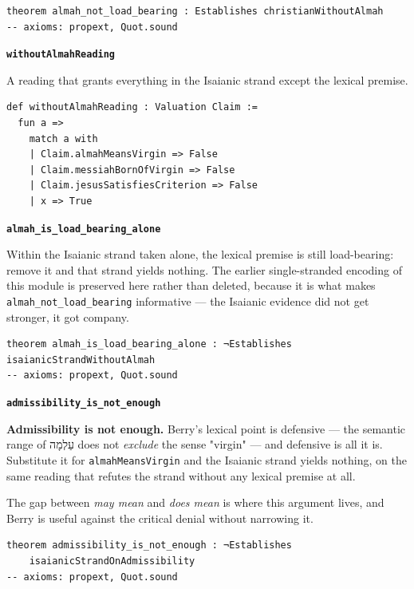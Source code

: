 \documentclass[11pt]{article}
\begin{document}
{\small\begin{verbatim}
theorem almah_not_load_bearing : Establishes christianWithoutAlmah
-- axioms: propext, Quot.sound
\end{verbatim}}
\par\medskip\noindent\textbf{\texttt{without\allowbreak{}Almah\allowbreak{}Reading}}\par\nobreak\noindent
A reading that grants everything in the Isaianic strand except the lexical premise.

{\small\begin{verbatim}
def withoutAlmahReading : Valuation Claim :=
  fun a =>
    match a with
    | Claim.almahMeansVirgin => False
    | Claim.messiahBornOfVirgin => False
    | Claim.jesusSatisfiesCriterion => False
    | x => True
\end{verbatim}}
\par\medskip\noindent\textbf{\texttt{almah\_\allowbreak{}is\_\allowbreak{}load\_\allowbreak{}bearing\_\allowbreak{}alone}}\par\nobreak\noindent
Within the Isaianic strand taken alone, the lexical premise is still load-bearing: remove it and that strand yields nothing. The earlier single-stranded encoding of this module is preserved here rather than deleted, because it is what makes \texttt{almah\_\allowbreak{}not\_\allowbreak{}load\_\allowbreak{}bearing} informative — the Isaianic evidence did not get stronger, it got company.

{\small\begin{verbatim}
theorem almah_is_load_bearing_alone : ¬Establishes isaianicStrandWithoutAlmah
-- axioms: propext, Quot.sound
\end{verbatim}}
\par\medskip\noindent\textbf{\texttt{admissibility\_\allowbreak{}is\_\allowbreak{}not\_\allowbreak{}enough}}\par\nobreak\noindent
\textbf{Admissibility is not enough.} Berry's lexical point is defensive — the semantic range of עַלְמָה does not \emph{exclude} the sense "virgin" — and defensive is all it is. Substitute it for \texttt{almah\allowbreak{}Means\allowbreak{}Virgin} and the Isaianic strand yields nothing, on the same reading that refutes the strand without any lexical premise at all.

The gap between \emph{may mean} and \emph{does mean} is where this argument lives, and Berry is useful against the critical denial without narrowing it.

{\small\begin{verbatim}
theorem admissibility_is_not_enough : ¬Establishes
    isaianicStrandOnAdmissibility
-- axioms: propext, Quot.sound
\end{verbatim}}
\end{document}
